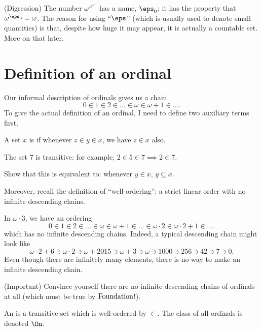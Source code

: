 \begin{remark}
	(Digression)
	The number $\omega^{\omega^{\omega^{\dots}}}$ has a name, $\eps_0$;
	it has the property that $\omega^{\eps_0} = \omega$.
	The reason for using ``$\eps$'' (which is usually used to denote small quantities)
	is that, despite how huge it may appear, it is actually a countable set.
	More on that later.
\end{remark}

\section{Definition of an ordinal}
Our informal description of ordinals gives us a chain
\[ 0 \in 1 \in 2 \in \dots \in \omega \in \omega+1 \in \dots. \]
To give the actual definition of an ordinal, I need to define two auxiliary terms first.
\begin{definition}
	A set $x$ is  if whenever $z \in y \in x$, we have $z \in x$ also.
\end{definition}
\begin{example}
	[$7$ is transitive]
	The set $7$ is transitive: for example, $2 \in 5 \in 7 \implies 2 \in 7$.
\end{example}
\begin{ques}
	Show that this is equivalent to: whenever $y \in x$, $y \subseteq x$.
\end{ques}
Moreover, recall the definition of ``well-ordering'': a strict linear order
with no infinite descending chains.
\begin{example}
	In $\omega \cdot 3$, we have an ordering
	\[ 0 \in 1 \in 2 \in \dots \in \omega \in \omega+1 \in \dots
		\in \omega \cdot 2 \in \omega \cdot 2 + 1 \in \dots. \]
	which has no infinite descending chains.
	Indeed, a typical descending chain might look like
	\[ \omega \cdot 2 + 6 \ni \omega \cdot 2 \ni
		\omega + 2015 \ni \omega+3 \ni \omega \ni 1000 \ni 256 \ni 42 \ni 7 \ni 0. \]
	Even though there are infinitely many elements, there is no way
	to make an infinite descending chain.
\end{example}
\begin{exercise}
	(Important) Convince yourself there are no infinite descending chains of ordinals at all
	(which must be true by $\mathrm{Foundation}$!).
\end{exercise}

\begin{definition}
	An  is a transitive set which is well-ordered by $\in$.
	The class of all ordinals is denoted $\On$.
\end{definition}

